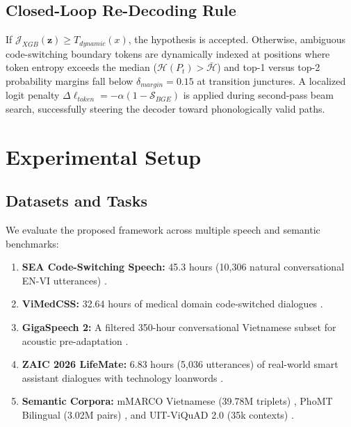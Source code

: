 \documentclass[9pt, conference, a4paper, compsocconf]{IEEEtran}
\begin{document}
\subsection{Closed-Loop Re-Decoding Rule}
If $\mathcal{J}_{XGB}(\mathbf{z}) \ge T_{dynamic}(x)$, the hypothesis is accepted. Otherwise, ambiguous code-switching boundary tokens are dynamically indexed at positions where token entropy exceeds the median ($\mathcal{H}(P_t) > \bar{\mathcal{H}}$) and top-1 versus top-2 probability margins fall below $\delta_{margin} = 0.15$ at transition junctures. A localized logit penalty $\Delta \ell_{token} = -\alpha (1 - \mathcal{S}_{BGE})$ is applied during second-pass beam search, successfully steering the decoder toward phonologically valid paths.

\section{Experimental Setup}

\subsection{Datasets and Tasks}
We evaluate the proposed framework across multiple speech and semantic benchmarks:
\begin{enumerate}
    \item \textbf{SEA Code-Switching Speech:} 45.3 hours (10,306 natural conversational EN-VI utterances) \cite{ho2024seacs}.
    \item \textbf{ViMedCSS:} 32.64 hours of medical domain code-switched dialogues \cite{pham2024vimedcss}.
    \item \textbf{GigaSpeech 2:} A filtered 350-hour conversational Vietnamese subset for acoustic pre-adaptation \cite{wang2024gigaspeech2}.
    \item \textbf{ZAIC 2026 LifeMate:} 6.83 hours (5,036 utterances) of real-world smart assistant dialogues with technology loanwords \cite{zaic2026lifemate}.
    \item \textbf{Semantic Corpora:} mMARCO Vietnamese (39.78M triplets) \cite{bonnefoy2021mmarco}, PhoMT Bilingual (3.02M pairs) \cite{phan2021phomt}, and UIT-ViQuAD 2.0 (35k contexts) \cite{phan2021phomt}.
\end{enumerate}
\end{document}
